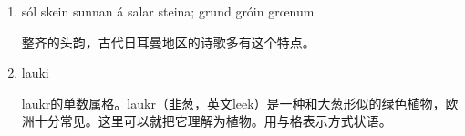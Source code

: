 \begin{grammar*}{}
    \begin{enumerate}[leftmargin=*]
        \item sól skein sunnan á salar steina; grund gróin grœnum

              整齐的头韵，古代日耳曼地区的诗歌多有这个特点。

        \item lauki

              laukr的单数属格。laukr（韭葱，英文leek）是一种和大葱形似的绿色植物，欧洲十分常见。这里可以就把它理解为植物。用与格表示方式状语。
    \end{enumerate}
\end{grammar*}
\hspace*{\fill}\\ %

